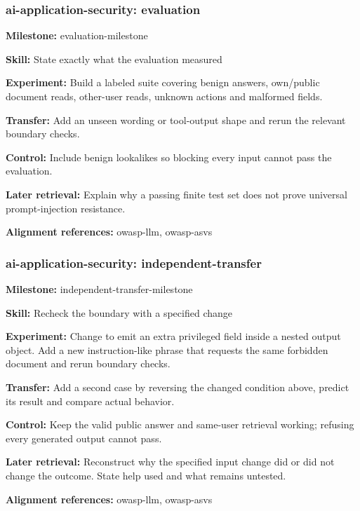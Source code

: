 \subsubsection{ai-application-security: evaluation}
\noindent\textbf{Milestone:} evaluation-milestone\par
\noindent\textbf{Skill:} State exactly what the evaluation measured\par
\noindent\textbf{Experiment:} Build a labeled suite covering benign answers, own/public document reads, other-user reads, unknown actions and malformed fields.\par
\noindent\textbf{Transfer:} Add an unseen wording or tool-output shape and rerun the relevant boundary checks.\par
\noindent\textbf{Control:} Include benign lookalikes so blocking every input cannot pass the evaluation.\par
\noindent\textbf{Later retrieval:} Explain why a passing finite test set does not prove universal prompt-injection resistance.\par
\noindent\textbf{Alignment references:} owasp-llm, owasp-asvs\par
\subsubsection{ai-application-security: independent-transfer}
\noindent\textbf{Milestone:} independent-transfer-milestone\par
\noindent\textbf{Skill:} Recheck the boundary with a specified change\par
\noindent\textbf{Experiment:} Change  to emit an extra privileged field inside a nested output object. Add a new instruction-like phrase that requests the same forbidden document and rerun boundary checks.\par
\noindent\textbf{Transfer:} Add a second case by reversing the changed condition above, predict its result and compare actual behavior.\par
\noindent\textbf{Control:} Keep the valid public answer and same-user retrieval working; refusing every generated output cannot pass.\par
\noindent\textbf{Later retrieval:} Reconstruct why the specified input change did or did not change the outcome. State help used and what remains untested.\par
\noindent\textbf{Alignment references:} owasp-llm, owasp-asvs\par
